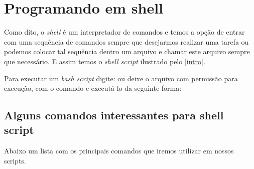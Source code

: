 \documentclass[11pt]{ifscarticle}
\begin{document}
\section{Programando em shell}

Como dito, o \textit{shell} é um interpretador de comandos e temos a opção de entrar com uma sequência de comandos sempre que desejarmos realizar uma tarefa ou podemos colocar tal sequência dentro um arquivo e chamar este arquivo sempre que necessário. E assim temos o \textit{shell script} ilustrado pelo \autoref{intro}.



\begin{tip}
	Para executar um \textit{bash script} digite:  ou deixe o arquivo com permissão para execução, com o comando  e executá-lo da seguinte forma: 
\end{tip}

\subsection{Alguns comandos interessantes para shell script}

Abaixo um lista com os principais comandos que iremos utilizar em nossos scripts.
\end{document}

